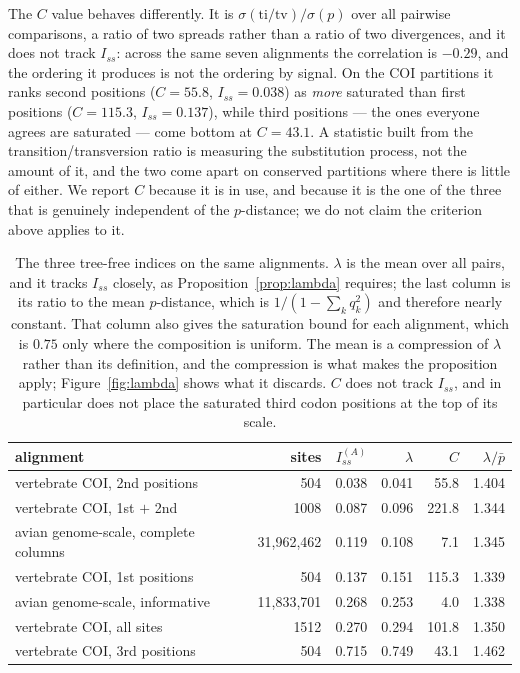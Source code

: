 \documentclass[preprint,12pt,authoryear]{elsarticle}
\newcommand{\Iss}{I_{ss}}
\theoremstyle{definition}
\theoremstyle{remark}
\begin{document}
The $C$ value behaves differently. It is
$\sigma(\mathrm{ti/tv})/\sigma(p)$ over all pairwise comparisons, a ratio of
two spreads rather than a ratio of two divergences, and it does not track
$\Iss$: across the same seven alignments the correlation is $-0.29$, and the
ordering it produces is not the ordering by signal. On the COI partitions it
ranks second positions ($C=55.8$, $\Iss=0.038$) as \emph{more} saturated than
first positions ($C=115.3$, $\Iss=0.137$), while third positions --- the ones
everyone agrees are saturated --- come bottom at $C=43.1$. A statistic built
from the transition/transversion ratio is measuring the substitution process,
not the amount of it, and the two come apart on conserved partitions where
there is little of either. We report $C$ because it is in use, and because it
is the one of the three that is genuinely independent of the $p$-distance; we
do not claim the criterion above applies to it.

\begin{table}[t]
\centering
\small
\setlength{\tabcolsep}{5pt}
\begin{tabular}{lrrrrr}
\toprule
alignment & sites & $\Iss^{(A)}$ & $\lambda$ & $C$
          & $\lambda/\bar p$ \\
\midrule
vertebrate COI, 2nd positions        & 504        & 0.038 & 0.041 & 55.8  & 1.404 \\
vertebrate COI, 1st $+$ 2nd          & 1008       & 0.087 & 0.096 & 221.8 & 1.344 \\
avian genome-scale, complete columns & 31,962,462 & 0.119 & 0.108 & 7.1   & 1.345 \\
vertebrate COI, 1st positions        & 504        & 0.137 & 0.151 & 115.3 & 1.339 \\
avian genome-scale, informative      & 11,833,701 & 0.268 & 0.253 & 4.0   & 1.338 \\
vertebrate COI, all sites            & 1512       & 0.270 & 0.294 & 101.8 & 1.350 \\
vertebrate COI, 3rd positions        & 504        & 0.715 & 0.749 & 43.1  & 1.462 \\
\bottomrule
\end{tabular}
\caption{The three tree-free indices on the same alignments. $\lambda$ is the
mean over all pairs, and it tracks $\Iss$ closely, as
Proposition~\ref{prop:lambda} requires; the last column is its ratio to the
mean $p$-distance, which is $1/(1-\sum_kq_k^2)$ and therefore nearly constant.
That column also gives the saturation bound for each alignment, which is
$0.75$ only where the composition is uniform. The mean is a compression of
$\lambda$ rather than its definition, and the compression is what makes the
proposition apply; Figure~\ref{fig:lambda} shows what it discards. $C$ does
not track $\Iss$, and in particular does not place the saturated third codon
positions at the top of its scale.}
\label{tab:indices}
\end{table}
\end{document}

